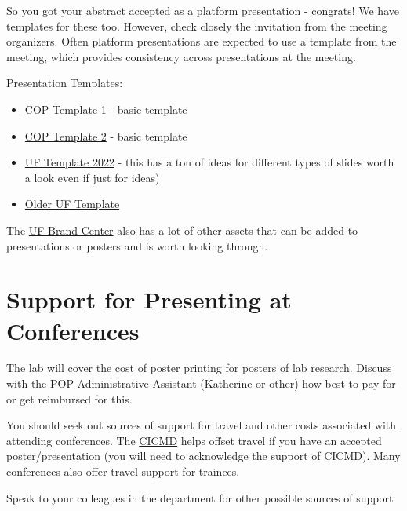 \documentclass[
  letterpaper,
  DIV=11,
  numbers=noendperiod]{scrreprt}
\begin{document}
So you got your abstract accepted as a platform presentation - congrats!
We have templates for these too. However, check closely the invitation
from the meeting organizers. Often platform presentations are expected
to use a template from the meeting, which provides consistency across
presentations at the meeting.

Presentation Templates:

\begin{itemize}
\item
  \href{/assets/templates/presentations/2017-cop-16x9-external-presentations-1.pptx}{COP
  Template 1} - basic template
\item
  \href{/assets/templates/presentations/2017-cop-16x9-external-presentations-2.pptx}{COP
  Template 2} - basic template
\item
  \href{/assets/templates/presentations/UF-PowerPoint_Template_2022.potx}{UF
  Template 2022} - this has a ton of ideas for different types of slides
  worth a look even if just for ideas)
\item
  \href{/assets/templates/presentations/UF_branded_PowerPoint_template_widescreen.ppt}{Older
  UF Template}
\end{itemize}

The \href{https://brandcenter.ufl.edu/downloads/}{UF Brand Center} also
has a lot of other assets that can be added to presentations or posters
and is worth looking through.

\hypertarget{support-for-presenting-at-conferences}{%
\section{Support for Presenting at
Conferences}\label{support-for-presenting-at-conferences}}

The lab will cover the cost of poster printing for posters of lab
research. Discuss with the POP Administrative Assistant (Katherine or
other) how best to pay for or get reimbursed for this.

You should seek out sources of support for travel and other costs
associated with attending conferences. The
\href{https://cicmd.center.ufl.edu/}{CICMD} helps offset travel if you
have an accepted poster/presentation (you will need to acknowledge the
support of CICMD). Many conferences also offer travel support for
trainees.

Speak to your colleagues in the department for other possible sources of
support

\end{document}
